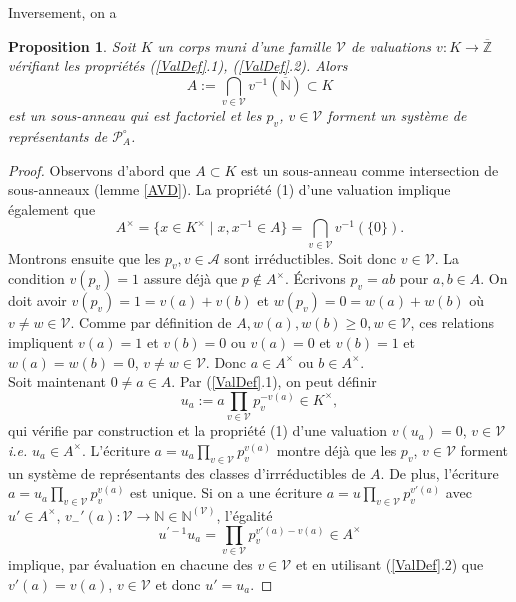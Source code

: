\documentclass[a4paper, oneside, 12pt]{book}
\theoremstyle{theoremeStyle} %
\newtheorem{proposition}[theoreme]{Proposition}
\theoremstyle{definition} %
\newcommand{\ie}{\textit{i.e.}} %
\newcommand{\Z}{\mathbb{Z}}
\newcommand{\N}{\mathbb{N}}
\begin{document}
Inversement, on a


\begin{proposition}
  Soit $K$ un corps muni d'une famille $\mathcal{V}$ de valuations $v:K\rightarrow \overline{\Z}$ vérifiant les propriétés (\ref{ValDef}.1), (\ref{ValDef}.2). Alors $$A:=\displaystyle{\bigcap_{v\in\mathcal{V}}}v^{-1}(\overline{\N})\subset K$$ est un sous-anneau qui est factoriel et les $p_v$, $v\in\mathcal{V}$ forment un système de représentants de $\mathcal{P}_A^\circ$.
\end{proposition}

\begin{proof}Observons d'abord que  $A\subset K$ est un sous-anneau comme intersection de sous-anneaux (lemme \ref{AVD}). La propriété (1) d'une valuation implique également que $$A^\times=\{ x\in K^\times\;|\; x,x^{-1}\in A\} =\displaystyle{\bigcap_{v\in\mathcal{V}}v^{-1}(\{0\})}.$$
 Montrons ensuite que les $p_v, v\in\mathcal{A}$ sont irréductibles. Soit donc $v\in \mathcal{V}$. La condition $v(p_v)=1$ assure déjà que $p\notin A^\times$. Écrivons $p_v=ab$ pour $a,b\in A$. On doit avoir $v(p_v)=1=v(a)+v(b)$ et $w(p_v)=0=w(a)+w(b)$ où $v\not=w\in\mathcal{V}$. Comme par définition de $A, w(a),w(b)\geq 0, w\in\mathcal{V}$, ces relations impliquent $v(a)=1$ et $v(b)=0$ ou $v(a)=0$ et $v(b)=1$ et $w(a)=w(b)=0$, $v\not=w\in\mathcal{V}$. Donc $a\in A^\times$ ou $b\in A^\times$.\\
 Soit maintenant $0\not=a\in A$. Par (\ref{ValDef}.1), on peut définir  $$u_a:=a\prod_{v\in\mathcal{V}}p_v^{-v(a)}\in K^\times,$$
qui vérifie par construction et la propriété (1) d'une valuation $v(u_a)=0$, $v\in\mathcal{V}$ \ie{} $u_a\in A^\times$. L'écriture  $a=u_a\prod_{v\in\mathcal{V}}p_v^{v(a)}$ montre déjà que les $p_v$, $v\in\mathcal{V}$ forment  un système de représentants des classes d'irrréductibles de $A$. De plus, l'écriture $a=u_a\prod_{v\in\mathcal{V}}p_v^{v(a)}$ est unique. Si on a une écriture $a=u\prod_{v\in\mathcal{V}}p_v^{v'(a)}$
avec $u'\in A^\times$, $v_-'(a):\mathcal{V}\rightarrow \N\in\N^{(\mathcal{V})}$, l'égalité
 $$u^{'-1} u_a=\prod_{v\in\mathcal{V}}p_v^{v'(a)-v(a)}\in A^\times$$
implique, par évaluation en chacune des $v\in\mathcal{V}$ et en utilisant (\ref{ValDef}.2) que $v'(a)=v(a)$, $v\in\mathcal{V}$ et donc $u'=u_a$.
\end{proof}
\end{document}
